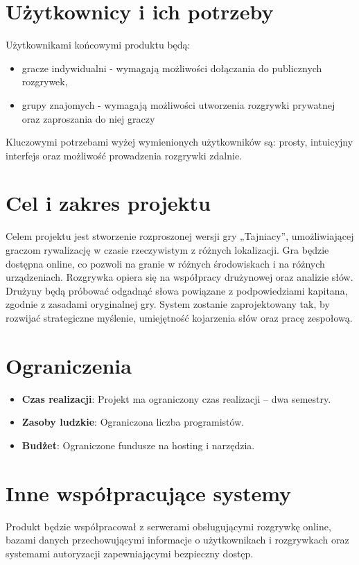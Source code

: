 \documentclass[12pt,a4paper,colorlinks=true,linkcolor=NavyBlue,citecolor=red,urlcolor=NavyBlue]{book}
\begin{document}
\section{Użytkownicy i ich potrzeby}
Użytkownikami końcowymi produktu będą:
\begin{itemize}
    \item gracze indywidualni - wymagają możliwości dołączania do publicznych rozgrywek, 
    \item grupy znajomych - wymagają możliwości utworzenia rozgrywki prywatnej oraz zaproszania do niej graczy
\end{itemize}
Kluczowymi potrzebami wyżej wymienionych użytkowników są: prosty, intuicyjny interfejs oraz możliwość prowadzenia rozgrywki zdalnie.

\section{Cel i zakres projektu}
Celem projektu jest stworzenie rozproszonej wersji gry „Tajniacy”, umożliwiającej graczom rywalizację w czasie rzeczywistym z różnych lokalizacji. Gra będzie dostępna online, co pozwoli na granie w różnych środowiskach i na różnych urządzeniach. Rozgrywka opiera się na współpracy drużynowej oraz analizie słów. Drużyny będą próbować odgadnąć słowa powiązane z podpowiedziami kapitana, zgodnie z zasadami oryginalnej gry. System zostanie zaprojektowany tak, by rozwijać strategiczne myślenie, umiejętność kojarzenia słów oraz pracę zespołową. 

\section{Ograniczenia}
\begin{itemize}
    \item \textbf{Czas realizacji}: Projekt ma ograniczony czas realizacji – dwa semestry. 
    \item \textbf{Zasoby ludzkie}: Ograniczona liczba programistów.
    \item \textbf{Budżet}: Ograniczone fundusze na hosting i narzędzia. 
\end{itemize}

\section{Inne współpracujące systemy}
Produkt będzie współpracował z serwerami obsługującymi rozgrywkę online, bazami danych przechowującymi informacje o użytkownikach i rozgrywkach oraz systemami autoryzacji zapewniającymi bezpieczny dostęp.
\end{document}
